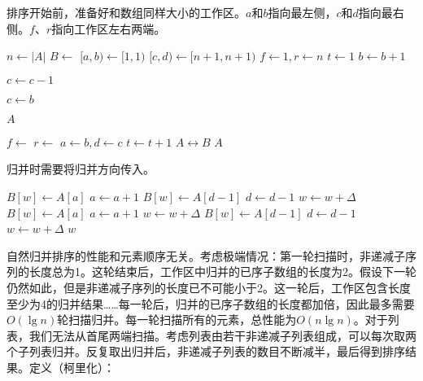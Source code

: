 \documentclass[b5paper]{ctexart}
\begin{document}
排序开始前，准备好和数组同样大小的工作区。$a$和$b$指向最左侧，$c$和$d$指向最右侧。$f$、$r$指向工作区左右两端。

\begin{algorithmic}[1]
    \State $n \gets |A|$
    \State $B \gets$   
    \Loop
      \State $[a, b) \gets [1, 1)$
      \State $[c, d) \gets [n+1, n+1)$
      \State $f \gets 1, r \gets n$ 
      \State $t \gets 1$            
                     
        \Repeat \Comment{扩展$[a, b)$}
          \State $b \gets b + 1$

        \Repeat \Comment{扩展$[c, d)$}
          \State $c \gets c - 1$

         
          \State $c \gets b$
        \EndIf

         \Comment{$[a, b)$覆盖全数组时排序结束}
          \State \Return $A$
        \EndIf

         
          \State $f \gets$ \Call{Merge}{$A, [a, b), [c, d), B, f, 1$}
        \Else {}
          \State $r \gets$ \Call{Merge}{$A, [a, b), [c, d), B, r, -1$}
        \EndIf
        \State $a \gets b, d \gets c$
        \State $t \gets t + 1$
      \EndWhile
      \State {} $A \leftrightarrow B$ 
    \EndLoop
  \EndIf
  \State \Return $A$
\EndFunction
\end{algorithmic}

归并时需要将归并方向传入。

\begin{algorithmic}[1]
\Function{Merge}{$A, [a, b), [c, d), B, w, \Delta$}
      \State $B[w] \gets A[a]$
      \State $a \gets a + 1$
    \Else
      \State $B[w] \gets A[d-1]$
      \State $d \gets d - 1$
    \EndIf
    \State $w \gets w + \Delta$
  \EndWhile
    \State $B[w] \gets A[a]$
    \State $a \gets a + 1$
    \State $w \gets w + \Delta$
  \EndWhile
    \State $B[w] \gets A[d-1]$
    \State $d \gets d - 1$
    \State $w \gets w + \Delta$
  \EndWhile
  \State \Return $w$
\EndFunction
\end{algorithmic}

自然归并排序的性能和元素顺序无关。考虑极端情况：第一轮扫描时，非递减子序列的长度总为1。这轮结束后，工作区中归并的已序子数组的长度为2。假设下一轮仍然如此，但是非递减子序列的长度已不可能小于2。这一轮后，工作区包含长度至少为4的归并结果……每一轮后，归并的已序子数组的长度都加倍，因此最多需要$O(\lg n)$轮扫描归并。每一轮扫描所有的元素，总性能为$O(n \lg n)$。对于列表，我们无法从首尾两端扫描。考虑列表由若干非递减子列表组成，可以每次取两个子列表归并。反复取出归并后，非递减子列表的数目不断减半，最后得到排序结果。定义（柯里化）：
\end{document}
